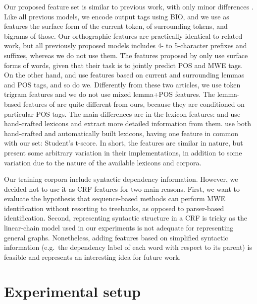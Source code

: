 \documentclass[output=paper,
modfonts
]{langscibook}
\begin{document}
Our proposed feature set is similar to previous work, with only minor differences \citep{constant-sigogne:2011:MWE,schneider2014,riedl-biemann:2016:MWE}. Like all previous models, we encode output tags using BIO, and we use as features the surface form of the current token, of surrounding tokens, and bigrams of those. Our orthographic features are practically identical to related work, but all previously proposed models includes 4- to 5-character prefixes and suffixes, whereas we do not use them. The features proposed by \citet{constant-sigogne:2011:MWE} only use surface forms of words, given that their task is to jointly predict POS and MWE tags. On the other hand, \citet{schneider2014} and \citet{riedl-biemann:2016:MWE} use features based on current and surrounding lemmas and POS tags, and so do we. Differently from these two articles, we use token trigram features and we do not use mixed lemma+POS features. The lemma-based features of \citet{schneider2014} are quite different from ours, because they are conditioned on particular POS tags. The main differences are in the lexicon features: \citet{constant-sigogne:2011:MWE} and \citet{schneider2014} use hand-crafted lexicons and extract more detailed information from them. \citet{riedl-biemann:2016:MWE} use both hand-crafted and automatically built lexicons, having one feature in common with our set: Student's t-score. In short, the features are similar in nature, but present some arbitrary variation in their implementations, in addition to some variation due to the nature of the available lexicons and corpora.

Our training corpora include syntactic dependency information. However, we decided not to use it as CRF features for two main reasons. First, we want to evaluate the hypothesis that sequence-based methods can perform MWE identification without resorting to treebanks, as opposed to parser-based identification. Second, representing syntactic structure in a CRF is tricky as the linear-chain model used in our experiments is not adequate for representing general graphs. Nonetheless, adding features based on simplified syntactic information (e.g.\ the dependency label of each word with respect to its parent) is feasible and represents an interesting idea for future work.



\section{Experimental setup}
\label{schol:sec:setup}
\end{document}
